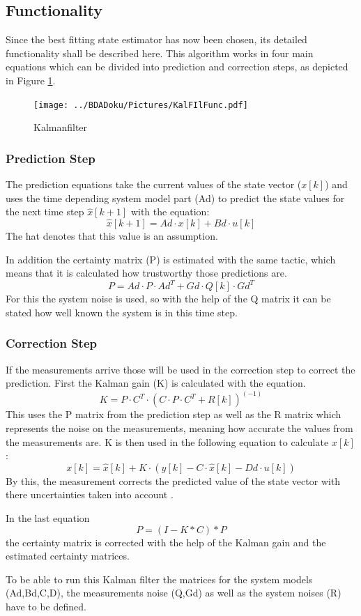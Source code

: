   \subsection{Functionality}
  Since the best fitting state estimator has now been chosen, its detailed functionality shall be described here.
  This algorithm works in four main equations which can be divided into prediction and correction steps, as depicted in Figure \ref{fig:Kalmanfilter}.

  \begin{figure}[h!]
    \centering
    \texttt{[image: ../BDADoku/Pictures/KalFIlFunc.pdf]}
    \caption{Kalmanfilter}
    \label{fig:Kalmanfilter}
  \end{figure}

  \subsubsection{Prediction Step}
  The prediction equations take the current values of the state vector ($x[k]$)
  and uses the time depending system model part (Ad) to predict the state values for the next time step $\hat{x}[k+1]$ with the equation:
  $$ \hat{x}[k+1] = Ad\cdot x[k] + Bd\cdot u[k] $$
  The hat denotes that this value is an assumption.

  In addition the certainty matrix (P) is estimated with the same tactic, which means that it is calculated how trustworthy those predictions are.
  $$ P = Ad\cdot P\cdot Ad^T + Gd\cdot Q[k]\cdot Gd^T$$
  For this the system noise is used, so with the help of the Q matrix it can be stated how well known the system is in this
  time step.

  \subsubsection{Correction Step}
  If the measurements arrive those will be used in the correction step to correct the prediction.
  First the Kalman gain (K) is calculated with the equation.
  $$ K = P\cdot C^T\cdot (C \cdot P \cdot C^T + R[k])^{(-1)} $$
  This uses the P matrix from the prediction step as well as the R matrix which represents the noise on the measurements, meaning how accurate the values from the measurements are.
  K is then used in the following equation to calculate $x[k]$:
  $$x[k] = \hat{x}[k] + K\cdot (y[k] - C\cdot \hat{x}[k]-Dd\cdot u[k])$$
  By this, the measurement corrects the predicted value of the state vector with there uncertainties taken into account \cite{DavidWSchultz2004}.

  In the last equation $$P = (I − K * C) * P $$ the certainty matrix is corrected with the help of the Kalman gain and the estimated certainty matrices.

  To be able to run this Kalman filter the matrices for the system models (Ad,Bd,C,D), the measurements noise (Q,Gd) as well as the system noises (R) have to be defined.




